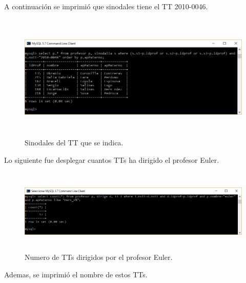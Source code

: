 \documentclass[12pt, titlepage]{article}
\begin{document}
	A continuación se imprimió que sinodales tiene el TT 2010-0046.
	\begin{figure}[H]
		\begin{center}
			\includegraphics[width=16cm, height=6cm]{img/ocho.png}
			\caption{Sinodales del TT que se indica.} 
			\label{fig:ejercicio9}
		\end{center}
	\end{figure}
	Lo siguiente fue desplegar cuantos TTs ha dirigido el profesor Euler.
	\begin{figure}[H]
		\begin{center}
			\includegraphics[width=16cm, height=4cm]{img/ultimo2.png}
			\caption{Numero de TTs dirigidos por el profesor Euler.} 
			\label{fig:ejercicio10}
		\end{center}
	\end{figure}
	Ademas, se imprimió el nombre de estos TTs.
\end{document}
